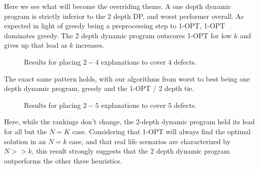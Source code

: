 Here we see what will become the overriding theme.  A one depth dynamic program is strictly inferior to the 2 depth DP, and worst performer overall.  As expected in light of greedy being a preprocessing step to 1-OPT, 1-OPT dominates greedy.  The 2 depth dynamic program outscores 1-OPT for low $k$ and gives up that lead as $k$ increases.

\begin{figure}[ht!] \centering
  \caption{Results for placing $2-4$ explanations to cover $4$ defects.}
\end{figure}
\FloatBarrier
The exact same pattern holds, with our algorithms from worst to best being one depth dynamic program, greedy and the 1-OPT / 2 depth tie.

\begin{figure}[ht!] \centering
  \caption{Results for placing $2-5$ explanations to cover $5$ defects.}
\end{figure}
\FloatBarrier
Here, while the rankings don't change, the 2-depth dynamic program held its lead for all but the $N=K$ case.  Considering that 1-OPT will always find the optimal solution in an $N=k$ case, and that real life scenarios are characterized by $N>>k$, this result strongly suggests that the 2 depth dynamic program outperforms the other three heuristics.  

